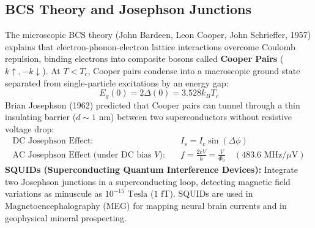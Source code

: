 \subsection{BCS Theory and Josephson Junctions}
The microscopic BCS theory (John Bardeen, Leon Cooper, John Schrieffer, 1957) explains that electron-phonon-electron lattice interactions overcome Coulomb repulsion, binding electrons into composite bosons called \textbf{Cooper Pairs} ($k\uparrow, -k\downarrow$). At $T < T_c$, Cooper pairs condense into a macroscopic ground state separated from single-particle excitations by an energy gap:
\begin{equation}
E_g(0) = 2\Delta(0) = 3.528 k_B T_c
\end{equation}
Brian Josephson (1962) predicted that Cooper pairs can tunnel through a thin insulating barrier ($d \sim 1\text{ nm}$) between two superconductors without resistive voltage drop:
\begin{align}
\text{DC Josephson Effect:} \quad & I_s = I_c \sin(\Delta\phi) \\
\text{AC Josephson Effect (under DC bias } V\text{):} \quad & f = \frac{2eV}{h} = \frac{V}{\Phi_0} \quad \left(483.6\text{ MHz}/\mu\text{V}\right)
\end{align}
\textbf{SQUIDs (Superconducting Quantum Interference Devices):} Integrate two Josephson junctions in a superconducting loop, detecting magnetic field variations as minuscule as $10^{-15}\text{ Tesla}$ ($1\text{ fT}$). SQUIDs are used in Magnetoencephalography (MEG) for mapping neural brain currents and in geophysical mineral prospecting.


